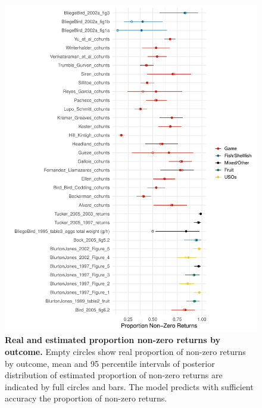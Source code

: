 \begin{figure}
    \centering
    \renewcommand{\thefigure}{S\arabic{figure}}
    \includegraphics[width=12cm]{text/images/Figure_S7.pdf}
    \caption{\textbf{Real and estimated proportion non-zero returns by outcome.} Empty circles show real proportion of non-zero returns by outcome, mean and 95 percentile intervals of posterior distribution of estimated proportion of non-zero returns are indicated by full circles and bars. The model predicts with sufficient accuracy the proportion of non-zero returns.}
    \label{fig:non_zero}
\end{figure}

